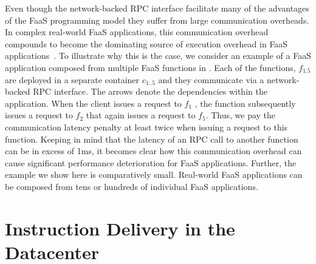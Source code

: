 \documentclass[../main.tex]{subfiles}
\begin{document}
\begin{refsection}
Even though the network-backed RPC interface facilitate many of the
advantages of the FaaS programming model they suffer from large
communication overheads. In complex real-world FaaS applications, this
communication overhead compounds to become the dominating source of
execution overhead in FaaS
applications~\cite{stellar,gan19_open_sourc_bench_suite_micros}. To
illustrate why this is the case, we consider an example of a FaaS
application composed from multiple FaaS functions in
. Each of the functions, $f_{1.5}$ are deployed in
a separate container $c_{1..5}$ and they communicate via a
network-backed RPC interface. The arrows denote the dependencies
within the application. When the client issues a request to $f_1$ ,
the function subsequently issues a request to $f_2$ that again issues
a request to $f_5$. Thus, we pay the communication latency penalty at
least twice when issuing a request to this function. Keeping in mind
that the latency of an RPC call to another function can be in excess
of 1ms, it becomes clear how this communication overhead can cause
significant performance deterioration for FaaS applications. Further,
the example we show here is comparatively small. Real-world FaaS
applications can be composed from tens or hundreds of individual FaaS
applications.




\section{Instruction Delivery in the Datacenter}
\label{sec:instr-delivery}

\label{sec:btb-background}



\end{refsection}
\end{document}
